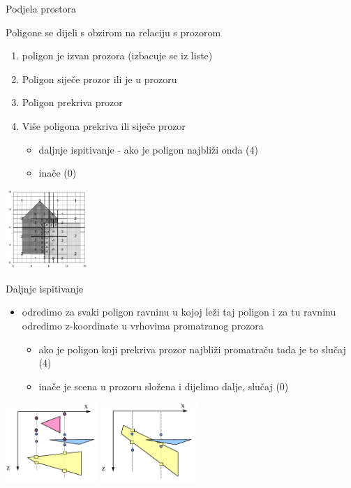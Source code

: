 \documentclass[9pt]{beamer}
\begin{document}
\begin{frame}{Podjela prostora}
	\begin{block}{Poligone se dijeli s obzirom na relaciju s prozorom}
		\begin{enumerate}
			\item poligon je izvan prozora (izbacuje se iz liste)
			\item Poligon siječe prozor ili je u prozoru
			\item Poligon prekriva prozor
			\item Više poligona prekriva ili siječe prozor
			\begin{itemize}
				\item daljnje ispitivanje - ako je poligon najbliži onda (4)
				\item inače (0)
			\end{itemize}
		\end{enumerate}
	\end{block}
	\begin{center}
		\includegraphics[height=3cm]{slike/05_warnock_1a.png}
	\end{center}
\end{frame}

\begin{frame}{Daljnje ispitivanje}
	\begin{itemize}
		\item odredimo za svaki poligon ravninu u kojoj leži taj poligon i za tu ravninu odredimo z-koordinate u vrhovima promatranog prozora
		\begin{itemize}
			\item ako je poligon koji prekriva prozor najbliži promatraču tada je to slučaj (4)
			\item inače je scena u prozoru složena i dijelimo dalje, slučaj (0)
		\end{itemize}
	\end{itemize}
	\begin{center}
		\includegraphics[height=3cm]{slike/05_warnock_2.png}
		\includegraphics[height=3cm]{slike/05_warnock_3.png}
	\end{center}
\end{frame}
\end{document}
